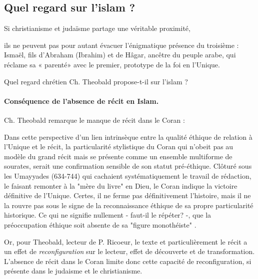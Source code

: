 \subsection{Quel regard sur l'islam ?}

Si christianisme et judaïsme partage une véritable proximité, 

\begin{singlequote}
    ils ne peuvent pas pour autant évacuer l'énigmatique présence du troisième : Ismaël, fils d'Abraham (Ibrahim) et de Hâgar, ancêtre du peuple arabe, qui réclame sa « parenté» avec le premier, prototype de la foi en l'Unique. \cite[p. 786]{theobald_christianisme_2007}
\end{singlequote}

Quel regard chrétien Ch. Theobald propose-t-il sur l'islam ? 


\paragraph{Conséquence de l'absence de récit en Islam.} Ch. Theobald remarque le manque de récit dans le Coran : 
\begin{singlequote}
 Dans cette perspective d'un lien intrinsèque entre la qualité éthique de relation à l'Unique et le récit, la particularité stylistique du Coran qui n'obeit pas au modèle du grand récit mais se présente comme un ensemble multiforme de sourates, serait une confirmation sensible de son statut pré-éthique.
Clôturé sous les Umayyades (634-744)  qui cachaient systématiquement le travail de rédaction, le faisant remonter à la "mère du livre" en Dieu, le Coran indique la victoire définitive de l'Unique. Certes, il ne ferme pas définitivement l'histoire, mais il ne la rouvre pas sous le signe de la reconnaissance éthique de sa propre particularité historique. Ce qui ne signifie nullement - faut-il le répéter? -, que la préoccupation éthique soit absente de sa "figure monothéiste" \cite{centre_sevres_paris_unique_1996}.
\end{singlequote}

Or, pour Theobald, lecteur de P. Ricoeur, le texte et particulièrement le récit a un effet de \textit{reconfiguration} sur le lecteur, effet de découverte et de transformation. L'absence de récit dans le Coran limite donc cette capacité de reconfiguration, si présente dans le judaisme et le christianisme. 

